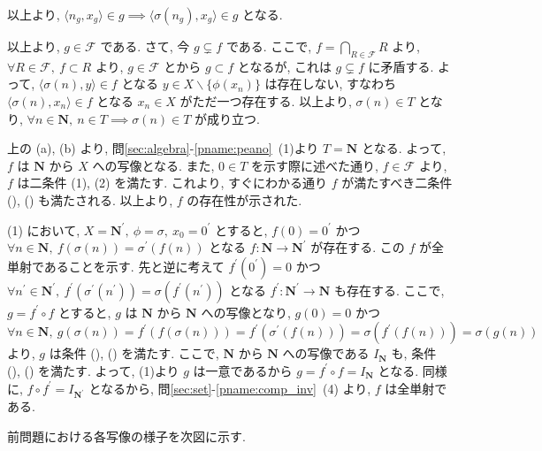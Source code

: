 \begin{nmprob}
{\begin{enumerate}
\begin{enumerate}
\begin{itemize}
以上より, $\langle n_g, x_g\rangle \in g \implies \langle \sigma (n_g), x_g\rangle \in g$ となる.
\end{itemize}
以上より, $g \in \mathcal{F}$ である. さて, 今 $g \subsetneq f$ である. ここで, $f = \bigcap_{R \in \mathcal{F}} R$ より, $\forall R \in \mathcal{F},\ f \subset R$ より,
$g \in \mathcal{F}$ とから $g \subset f$ となるが, これは $g \subsetneq f$ に矛盾する. よって, $\langle \sigma (n), y \rangle \in f$ となる $y \in X\backslash \{\phi (x_n) \}$ は存在しない,
すなわち $\langle \sigma (n), x_n \rangle \in f$ となる $x_n \in X$ がただ一つ存在する. 以上より, $\sigma (n) \in T$ となり, $\forall n \in \bm{N},\ n \in T \implies \sigma (n) \in T$ が成り立つ.
\end{enumerate}
上の (a), (b) より, 問\ref{sec:algebra}-\ref{pname:peano}\ (1)より $T = \bm{N}$ となる. よって, $f$ は $\bm{N}$ から $X$ への写像となる. また, $0 \in T$ を示す際に述べた通り, $f \in \mathcal{F}$ より, $f$ は二条件 (1), (2) を満たす.
これより, すぐにわかる通り $f$ が満たすべき二条件 (), () も満たされる. 以上より, $f$ の存在性が示された.
\end{enumerate}
\item
(1) において, $X = \bm{N}^{'},\ \phi = \sigma,\ x_0 = 0^{'}$ とすると, $f(0) = 0^{'}$ かつ $\forall n\in \bm{N},\ f(\sigma (n)) = \sigma^{'} (f(n))$ となる $f: \bm{N} \to \bm{N^{'}}$ が存在する.
この $f$ が全単射であることを示す. 先と逆に考えて $f^{'}(0^{'}) = 0$ かつ $\forall n^{'} \in \bm{N^{'}},\ f^{'}(\sigma^{'}(n^{'})) = \sigma (f^{'}(n^{'}))$ となる $f^{'}: \bm{N^{'}} \to \bm{N}$ も存在する. ここで, $g = f^{'} \circ f$ とすると, $g$ は $\bm{N}$ から $\bm{N}$ への写像となり,
$g(0) = 0$ かつ $\forall n \in \bm{N},\ g(\sigma (n)) = f^{'}(f(\sigma (n))) = f^{'}(\sigma^{'}(f(n))) = \sigma (f^{'}(f(n))) = \sigma (g(n))$ より, $g$ は条件 (), () を満たす.
ここで, $\bm{N}$ から $\bm{N}$ への写像である $I_{\bm{N}}$ も, 条件 (), () を満たす. よって, (1)より $g$ は一意であるから $g = f^{'} \circ f = I_{\bm{N}}$ となる. 同様に, $f \circ f^{'} = I_{\bm{N^{'}}}$ となるから,
問\ref{sec:set}-\ref{pname:comp_inv}\ (4) より, $f$ は全単射である.
} 


前問題における各写像の様子を次図に示す.
\begin{figure}[htbp]
    \centering
\end{figure}
\end{nmprob}
